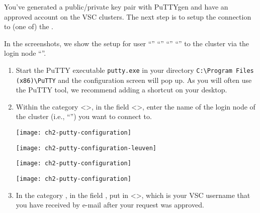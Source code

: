   You've generated a public/private key pair with PuTTYgen and have an approved
  account on the VSC clusters.  The next step is to setup the connection to (one
  of) the \hpc.

   In the screenshots, we show the setup for user
\ifantwerpen
``''
\fi
\ifbrussel
``''
\fi
\ifgent
``''
\fi
\ifleuven
``''
\fi
  to the \hpc cluster via the login node
  ``\strong{\emph{\loginnode}}''.

  \begin{enumerate}
    \item  Start the PuTTY executable \lstinline|putty.exe| in your
      directory \lstinline|C:\Program Files (x86)\PuTTY| and the
      configuration screen will pop up. As you will often use the PuTTY tool,
      we recommend adding a shortcut on your desktop.
    \item  Within the category <{}>{}, in the field
      <{}>{}, enter the name of the login node of the
      \hpc cluster (i.e., ``\strong{\emph{\loginnode}}'')
      you want to connect to.

\ifantwerpen
      \begin{center}
      \texttt{[image: ch2-putty-configuration]}
      \end{center}
\fi
\ifleuven
      \begin{center}
      \texttt{[image: ch2-putty-configuration-leuven]}
      \end{center}
\fi
\ifbrussel
      \begin{center}
      \texttt{[image: ch2-putty-configuration]}
      \end{center}
\fi
\ifgent
      \begin{center}
      \texttt{[image: ch2-putty-configuration]}
      \end{center}
\fi

    \item  In the category , in
      the field , put in
      <{}\emph{\userid}>{}, which is your VSC username that you have
      received by e-mail after your request was approved.


\end{enumerate}

